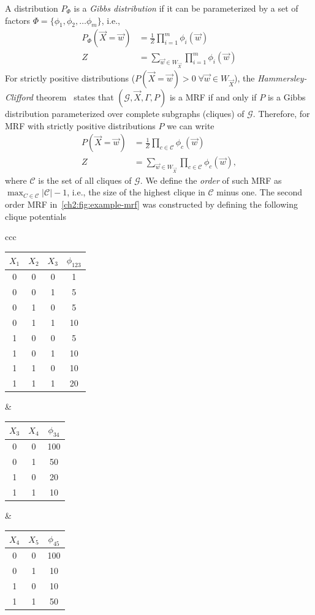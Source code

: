 A distribution $P_{\Phi}$ is a \emph{Gibbs distribution} if it can be parameterized by a set of factors $\Phi = \{\phi_1,\phi_2,\dots \phi_m\}$, i.e., 
\begin{align*}
	P_{\Phi}(\vec{X} = \vec{w}) &= \frac{1}{Z}\prod_{i=1}^{m}{\phi_i(\vec{w})} \\
	Z &= \sum_{\vec{w} \in W_{\vec{X}}}{ \prod_{i=1}^{m}{\phi_i(\vec{w})} }
\end{align*}
%
%
For strictly positive distributions ($P(\vec{X} = \vec{w}) > 0\; \forall \vec{w} \in W_{\vec{X}}$), the \emph{Hammersley-Clifford} theorem~\cite{koller09} states that $(\mathcal{G},\vec{X},\Gamma,P)$ is a MRF if and only if $P$ is a Gibbs distribution parameterized over complete subgraphs (cliques) of $\mathcal{G}$. Therefore, for MRF with strictly positive distributions $P$ we can write 
\begin{align}
	P(\vec{X} = \vec{w}) &= \frac{1}{Z}\prod_{c \in \mathcal{C}}{\phi_c(\vec{w})} \label{ch2:eq:gibbs-distribution}\\
	Z &=  \sum_{\vec{w} \in W_{\vec{X}}}{ \prod_{c \in \mathcal{C}}{\phi_c(\vec{w})} },\label{ch2:eq:gibbs-constant}
\end{align}
%
where $\mathcal{C}$ is the set of all cliques of $\mathcal{G}$. We define the \emph{order} of such MRF as $\max_{C \in \mathcal{C}} |\mathcal{C}|-1$, i.e., the size of the highest clique in $\mathcal{C}$ minus one. The second order MRF in~\cref{ch2:fig:example-mrf} was constructed by defining the following clique potentials

\begin{center}
\begin{tabular}{ccc}
\begin{tabular}{|c|c|c|c|}
\hline
$X_1$ & $X_2$ & $X_3$ & $\phi_{123}$\\
\hline
0 & 0 & 0 & 1\\
0 & 0 & 1 & 5\\
0 & 1 & 0 & 5\\
0 & 1 & 1 & 10\\
1 & 0 & 0 & 5\\
1 & 0 & 1 & 10\\
1 & 1 & 0 & 10\\
1 & 1 & 1 & 20\\
\hline
\end{tabular}&
\begin{tabular}{|c|c|c|}
\hline
$X_3$ & $X_4$ & $\phi_{34}$\\
\hline
0 & 0 & 100\\
0 & 1 & 50\\
1 & 0 & 20\\
1 & 1 & 10\\
\hline
\end{tabular}&
\begin{tabular}{|c|c|c|}
\hline
$X_4$ & $X_5$ & $\phi_{45}$\\
\hline
0 & 0 & 100\\
0 & 1 & 10\\
1 & 0 & 10\\
1 & 1 & 50\\
\hline
\end{tabular}
\end{tabular}
\end{center}

